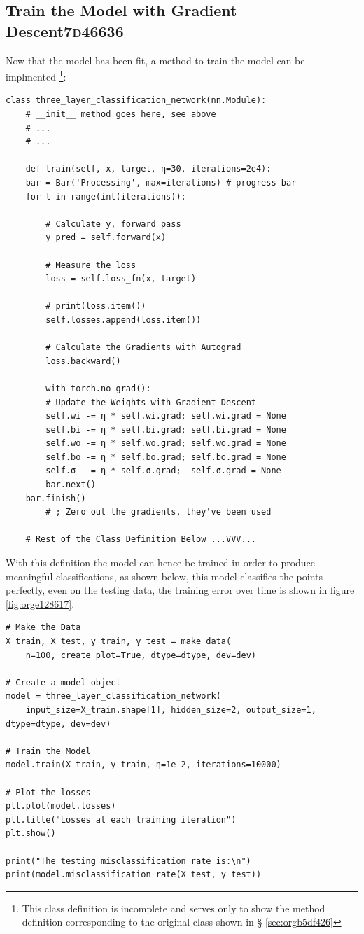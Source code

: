 \documentclass[a4paper,11pt,twoside]{article}
\begin{document}
\subsection{Train the Model with Gradient Descent\hfill{}\textsc{7d46636}}
\label{sec:orga999c55}
Now that the model has been fit, a method to train the model can be
implmented \footnote{This class definition is incomplete and serves only to show the
method definition corresponding to the original class shown in \S
\ref{sec:orgb5df426}}:
\begin{verbatim}
class three_layer_classification_network(nn.Module):
    # __init__ method goes here, see above
    # ...
    # ...

    def train(self, x, target, η=30, iterations=2e4):
	bar = Bar('Processing', max=iterations) # progress bar
	for t in range(int(iterations)):

	    # Calculate y, forward pass
	    y_pred = self.forward(x)

	    # Measure the loss
	    loss = self.loss_fn(x, target)

	    # print(loss.item())
	    self.losses.append(loss.item())

	    # Calculate the Gradients with Autograd
	    loss.backward()

	    with torch.no_grad():
		# Update the Weights with Gradient Descent 
		self.wi -= η * self.wi.grad; self.wi.grad = None
		self.bi -= η * self.bi.grad; self.bi.grad = None
		self.wo -= η * self.wo.grad; self.wo.grad = None
		self.bo -= η * self.bo.grad; self.bo.grad = None
		self.σ  -= η * self.σ.grad;  self.σ.grad = None
	    bar.next()
	bar.finish()
		# ; Zero out the gradients, they've been used

    # Rest of the Class Definition Below ...VVV...
\end{verbatim}

With this definition the model can hence be trained in order to
produce meaningful classifications, as shown below, this model classifies the
points perfectly, even on the testing data, the training error 
over time is shown in figure \ref{fig:orge128617}.

\begin{verbatim}
# Make the Data
X_train, X_test, y_train, y_test = make_data(
    n=100, create_plot=True, dtype=dtype, dev=dev)

# Create a model object
model = three_layer_classification_network(
    input_size=X_train.shape[1], hidden_size=2, output_size=1, dtype=dtype, dev=dev)

# Train the Model
model.train(X_train, y_train, η=1e-2, iterations=10000)

# Plot the losses
plt.plot(model.losses)
plt.title("Losses at each training iteration")
plt.show()

print("The testing misclassification rate is:\n")
print(model.misclassification_rate(X_test, y_test))
\end{verbatim}
\end{document}
